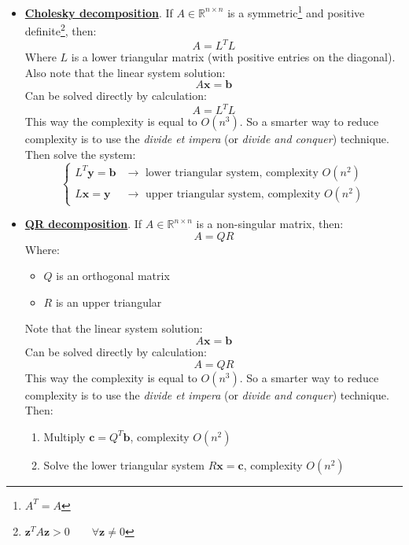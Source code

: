 \begin{itemize}
	\item \underline{\textbf{Cholesky decomposition}}. If $A \in \mathbb{R}^{n \times n}$ is a symmetric\footnote{$A^{T} = A$} and positive definite\footnote{$\mathbf{z}^{T} A \mathbf{z} > 0 \hspace{2em} \forall \mathbf{z} \ne 0$}, then:
	\begin{equation*}
		A = L^{T}L
	\end{equation*}
	Where $L$ is a lower triangular matrix (with positive entries on the diagonal). Also note that the linear system solution:
	\begin{equation*}
		A\mathbf{x} = \mathbf{b}
	\end{equation*}
	Can be solved directly by calculation:
	\begin{equation*}
		A = L^{T}L
	\end{equation*}
	This way the complexity is equal to $O\left(n^{3}\right)$. So a smarter way to reduce complexity is to use the \emph{divide et impera} (or \emph{divide and conquer}) technique. Then solve the system:
	\begin{equation*}
		\begin{cases}
			L^{T}\mathbf{y} = \mathbf{b} & \rightarrow \text{ lower triangular system, complexity } O\left(n^{2}\right) \\
			L\mathbf{x} = \mathbf{y}  & \rightarrow \text{ upper triangular system, complexity } O\left(n^{2}\right)
		\end{cases}
	\end{equation*}

	\item \underline{\textbf{QR decomposition}}. If $A \in \mathbb{R}^{n \times n}$ is a non-singular matrix, then:
	\begin{equation*}
		A = QR
	\end{equation*}
	Where:
	\begin{itemize}
		\item $Q$ is an orthogonal matrix
		\item $R$ is an upper triangular
	\end{itemize}
	Note that the linear system solution:
	\begin{equation*}
		A\mathbf{x} = \mathbf{b}
	\end{equation*}
	Can be solved directly by calculation:
	\begin{equation*}
		A = QR
	\end{equation*}
	This way the complexity is equal to $O\left(n^{3}\right)$. So a smarter way to reduce complexity is to use the \emph{divide et impera} (or \emph{divide and conquer}) technique. Then:
	\begin{enumerate}
		\item Multiply $\mathbf{c} = Q^{T}\mathbf{b}$, complexity $O\left(n^{2}\right)$
		
		\item Solve the lower triangular system $R\mathbf{x} = \mathbf{c}$, complexity $O\left(n^{2}\right)$
	\end{enumerate}
\end{itemize}